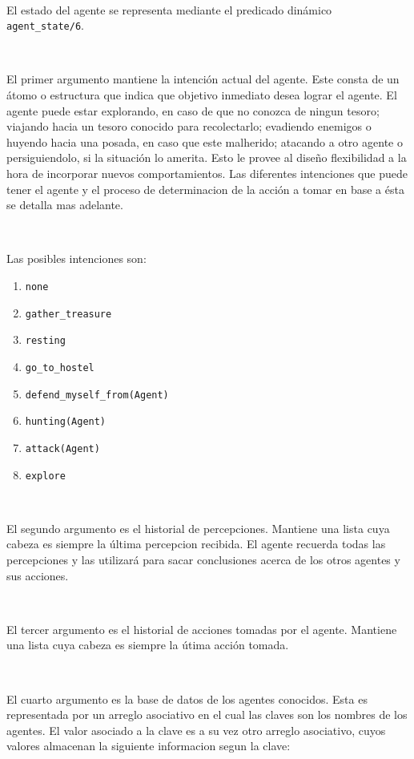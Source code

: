 \documentclass[a4paper,12pt]{report}
\begin{document}
\ 

El estado del agente se representa mediante el predicado din\'{a}mico \texttt{agent\_state/6}.

\ 

El primer argumento mantiene la intenci\'{o}n actual del agente.
Este consta de un \'{a}tomo o estructura que indica que objetivo inmediato desea lograr el agente.
El agente puede estar explorando, en caso de que no conozca de ningun tesoro; viajando hacia un 
tesoro conocido para recolectarlo; evadiendo enemigos o huyendo hacia una posada, en caso que 
este malherido; atacando a otro agente o persiguiendolo, si la situaci\'{o}n lo amerita.
Esto le provee al dise\~{n}o flexibilidad a la hora de incorporar nuevos comportamientos.
Las diferentes intenciones que puede tener el agente y el proceso de determinacion de la acci\'{o}n
a tomar en base a \'{e}sta se detalla mas adelante.

\ 

Las posibles intenciones son:
\begin{enumerate}
\item \texttt{none}
\item \texttt{gather\_treasure}
\item \texttt{resting}
\item \texttt{go\_to\_hostel}
\item \texttt{defend\_myself\_from(Agent)}
\item \texttt{hunting(Agent)}
\item \texttt{attack(Agent)}
\item \texttt{explore}
\end{enumerate}

\ 

El segundo argumento es el historial de percepciones. 
Mantiene una lista cuya cabeza es siempre la \'{u}ltima percepcion recibida.
El agente recuerda todas las percepciones y las utilizar\'{a} para sacar conclusiones acerca de los 
otros agentes y sus acciones.

\ 

El tercer argumento es el historial de acciones tomadas por el agente. 
Mantiene una lista cuya cabeza es siempre la \'{u}tima acci\'{o}n tomada.  

\ 

El cuarto argumento es la base de datos de los agentes conocidos.
Esta es representada por un arreglo asociativo en el cual las claves son los nombres de los agentes.
El valor asociado a la clave es a su vez otro arreglo asociativo, cuyos valores almacenan la 
siguiente informacion segun la clave:
\end{document}
